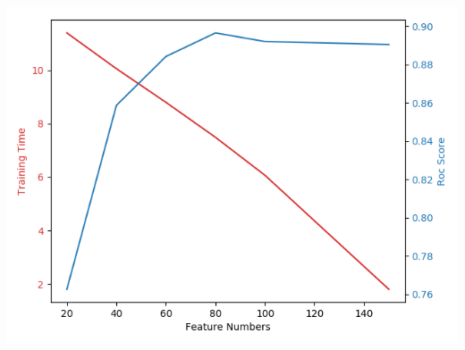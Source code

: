 \documentclass{article}
\begin{document}
\includegraphics{MA2823MLAssignment_1/MA2823-ML-Assignment_1/Comparison}
\end{document}
